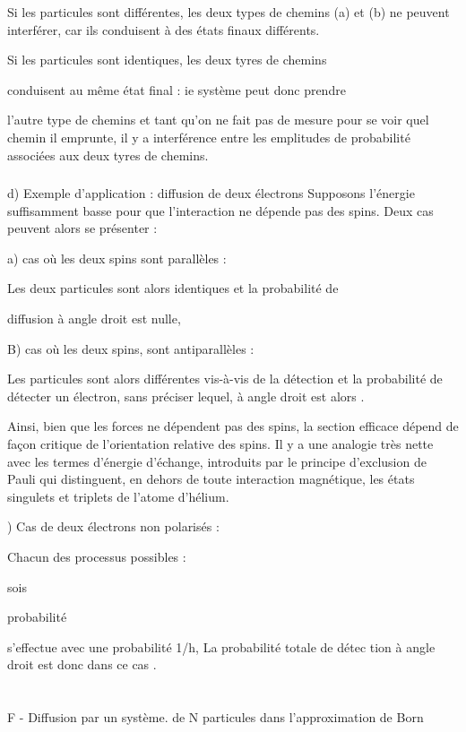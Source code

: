 Si les particules sont différentes, les deux types de chemins (a) et (b)
ne peuvent interférer, car ils conduisent à des états
finaux différents.

Si les particules sont identiques, les deux tyres de chemins

conduisent au même état final : ie système peut donc prendre

l'autre type de chemins et tant qu'on ne fait pas de mesure pour se
voir quel chemin il emprunte, il y a interférence entre les emplitudes
de probabilité associées aux deux tyres de chemins.
\subsubsection{}%
d) Exemple d'application : diffusion de deux électrons
Supposons l'énergie suffisamment basse pour que l'interaction ne
dépende pas des spins. Deux cas peuvent alors se présenter :

a) cas où les deux spins sont parallèles :

Les deux particules sont alors identiques et la probabilité de

diffusion à angle droit est nulle,


B) cas où les deux spins, sont antiparallèles :

Les particules sont alors différentes vis-à-vis de la
détection et la probabilité de détecter un électron, sans préciser
lequel, à angle droit est alors .

Ainsi, bien que les forces ne dépendent pas des spins, la section
efficace dépend de façon critique de l'orientation relative des
spins. Il y a une analogie très nette avec les termes d'énergie
d'échange, introduits par le principe d'exclusion de Pauli qui
distinguent, en dehors de toute interaction magnétique, les états
singulets et triplets de l'atome d'hélium.

) Cas de deux électrons non polarisés :

Chacun des processus possibles :

sois

probabilité

s'effectue avec une probabilité 1/h, La probabilité totale de détec
tion à angle droit est donc dans ce cas .

 

\section{}%
F - Diffusion par un système. de N particules dans l'approximation de Born

